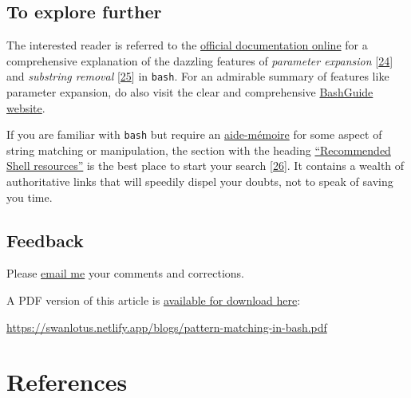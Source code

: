 \documentclass[
  a4paper,
]{article}
\begin{document}
\hypertarget{to-explore-further}{%
\subsection{To explore further}\label{to-explore-further}}

The interested reader is referred to the
\href{https://www.gnu.org/savannah-checkouts/gnu/bash/manual/bash.html\#Shell-Parameter-Expansion}{official
documentation online} for a comprehensive explanation of the dazzling
features of \emph{parameter expansion}
{[}\protect\hyperlink{ref-shellparamexp}{24}{]} and \emph{substring
removal} {[}\protect\hyperlink{ref-wikisubstring}{25}{]} in
\texttt{bash}. For an admirable summary of features like parameter
expansion, do also visit the clear and comprehensive
\href{https://mywiki.wooledge.org/BashGuide/Parameters}{BashGuide
website}.

If you are familiar with \texttt{bash} but require an
\href{https://www.thefreedictionary.com/aide+memoire}{aide-mémoire} for
some aspect of string matching or manipulation, the section with the
heading
\href{https://wiki.bash-hackers.org/start\#recommended_shell_resources}{``Recommended
Shell resources''} is the best place to start your search
{[}\protect\hyperlink{ref-bhwstart}{26}{]}. It contains a wealth of
authoritative links that will speedily dispel your doubts, not to speak
of saving you time.

\hypertarget{feedback}{%
\subsection{Feedback}\label{feedback}}

Please \href{mailto:feedback.swanlotus@gmail.com}{email me} your
comments and corrections.

\noindent A PDF version of this article is
\href{./pattern-matching-in-bash.pdf}{available for download here}:

\begin{small}

\begin{sffamily}

\url{https://swanlotus.netlify.app/blogs/pattern-matching-in-bash.pdf}

\end{sffamily}

\end{small}

\hypertarget{bibliography}{%
\section*{References}\label{bibliography}}
\end{document}
